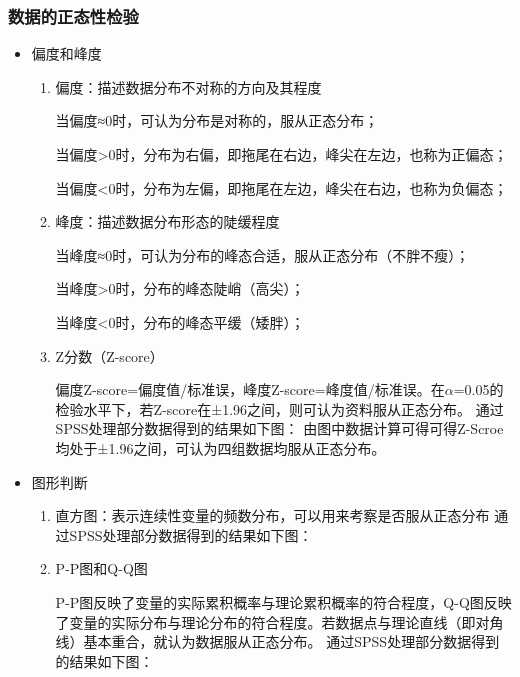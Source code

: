 \documentclass[UTF8]{ctexart}
\begin{document}
	\subsubsection{数据的正态性检验}
	\begin{itemize}
		\item 偏度和峰度
		\begin{enumerate}
			\item 偏度：描述数据分布不对称的方向及其程度
			
			当偏度≈0时，可认为分布是对称的，服从正态分布；
			
			当偏度>0时，分布为右偏，即拖尾在右边，峰尖在左边，也称为正偏态；
			
			当偏度<0时，分布为左偏，即拖尾在左边，峰尖在右边，也称为负偏态；
			
			\item 峰度：描述数据分布形态的陡缓程度
			
			当峰度≈0时，可认为分布的峰态合适，服从正态分布（不胖不瘦）；
			
			当峰度>0时，分布的峰态陡峭（高尖）；
			
			当峰度<0时，分布的峰态平缓（矮胖）；
			
			\item Z分数（Z-score） 
			
			偏度Z-score=偏度值/标准误，峰度Z-score=峰度值/标准误。在$\alpha$=0.05的检验水平下，若Z-score在±1.96之间，则可认为资料服从正态分布。
			通过SPSS处理部分数据得到的结果如下图：	
		由图中数据计算可得可得Z-Scroe均处于±1.96之间，可认为四组数据均服从正态分布。			
		\end{enumerate}
		\item 图形判断
		\begin{enumerate}
			\item 直方图：表示连续性变量的频数分布，可以用来考察是否服从正态分布
			通过SPSS处理部分数据得到的结果如下图：
			\item P-P图和Q-Q图
			
			P-P图反映了变量的实际累积概率与理论累积概率的符合程度，Q-Q图反映了变量的实际分布与理论分布的符合程度。若数据点与理论直线（即对角线）基本重合，就认为数据服从正态分布。
			通过SPSS处理部分数据得到的结果如下图：
			
		\end{enumerate}
	\end{itemize}
\end{document}
